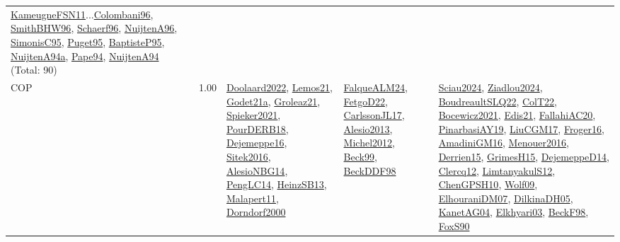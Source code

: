 {\begin{longtable}{p{3cm}r>{\raggedright\arraybackslash}p{6cm}>{\raggedright\arraybackslash}p{6cm}>{\raggedright\arraybackslash}p{8cm}}
\hyperref[detail:KameugneFSN11]{KameugneFSN11}...\hyperref[detail:Colombani96]{Colombani96}, \hyperref[detail:SmithBHW96]{SmithBHW96}, \hyperref[detail:Schaerf96]{Schaerf96}, \hyperref[detail:NuijtenA96]{NuijtenA96}, \hyperref[detail:SimonisC95]{SimonisC95}, \hyperref[detail:Puget95]{Puget95}, \hyperref[detail:BaptisteP95]{BaptisteP95}, \hyperref[detail:NuijtenA94a]{NuijtenA94a}, \hyperref[detail:Pape94]{Pape94}, \hyperref[detail:NuijtenA94]{NuijtenA94} (Total: 90)\\
\index{COP}\index{CP!COP}COP &  1.00 & \hyperref[detail:Doolaard2022]{Doolaard2022}, \hyperref[detail:Lemos21]{Lemos21}, \hyperref[detail:Godet21a]{Godet21a}, \hyperref[detail:Groleaz21]{Groleaz21}, \hyperref[detail:Spieker2021]{Spieker2021}, \hyperref[detail:PourDERB18]{PourDERB18}, \hyperref[detail:Dejemeppe16]{Dejemeppe16}, \hyperref[detail:Sitek2016]{Sitek2016}, \hyperref[detail:AlesioNBG14]{AlesioNBG14}, \hyperref[detail:PengLC14]{PengLC14}, \hyperref[detail:HeinzSB13]{HeinzSB13}, \hyperref[detail:Malapert11]{Malapert11}, \hyperref[detail:Dorndorf2000]{Dorndorf2000} & \hyperref[detail:FalqueALM24]{FalqueALM24}, \hyperref[detail:FetgoD22]{FetgoD22}, \hyperref[detail:CarlssonJL17]{CarlssonJL17}, \hyperref[detail:Alesio2013]{Alesio2013}, \hyperref[detail:Michel2012]{Michel2012}, \hyperref[detail:Beck99]{Beck99}, \hyperref[detail:BeckDDF98]{BeckDDF98} & \hyperref[detail:Sciau2024]{Sciau2024}, \hyperref[detail:Ziadlou2024]{Ziadlou2024}, \hyperref[detail:BoudreaultSLQ22]{BoudreaultSLQ22}, \hyperref[detail:ColT22]{ColT22}, \hyperref[detail:Bocewicz2021]{Bocewicz2021}, \hyperref[detail:Edis21]{Edis21}, \hyperref[detail:FallahiAC20]{FallahiAC20}, \hyperref[detail:PinarbasiAY19]{PinarbasiAY19}, \hyperref[detail:LiuCGM17]{LiuCGM17}, \hyperref[detail:Froger16]{Froger16}, \hyperref[detail:AmadiniGM16]{AmadiniGM16}, \hyperref[detail:Menouer2016]{Menouer2016}, \hyperref[detail:Derrien15]{Derrien15}, \hyperref[detail:GrimesH15]{GrimesH15}, \hyperref[detail:DejemeppeD14]{DejemeppeD14}, \hyperref[detail:Clercq12]{Clercq12}, \hyperref[detail:LimtanyakulS12]{LimtanyakulS12}, \hyperref[detail:ChenGPSH10]{ChenGPSH10}, \hyperref[detail:Wolf09]{Wolf09}, \hyperref[detail:ElhouraniDM07]{ElhouraniDM07}, \hyperref[detail:DilkinaDH05]{DilkinaDH05}, \hyperref[detail:KanetAG04]{KanetAG04}, \hyperref[detail:Elkhyari03]{Elkhyari03}, \hyperref[detail:BeckF98]{BeckF98}, \hyperref[detail:FoxS90]{FoxS90}\\

\end{longtable}}
